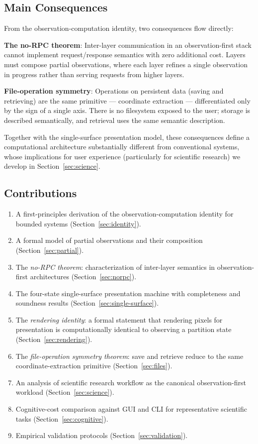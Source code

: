 \documentclass[11pt,twocolumn,a4paper]{article}
\theoremstyle{definition}
\theoremstyle{remark}
\begin{document}
\subsection{Main Consequences}

From the observation-computation identity, two consequences flow directly:

\textbf{The no-RPC theorem}: Inter-layer communication in an observation-first stack cannot implement request/response semantics with zero additional cost. Layers must compose partial observations, where each layer refines a single observation in progress rather than serving requests from higher layers.

\textbf{File-operation symmetry}: Operations on persistent data (saving and retrieving) are the same primitive --- coordinate extraction --- differentiated only by the sign of a single axis. There is no filesystem exposed to the user; storage is described semantically, and retrieval uses the same semantic description.

Together with the single-surface presentation model, these consequences define a computational architecture substantially different from conventional systems, whose implications for user experience (particularly for scientific research) we develop in Section~\ref{sec:science}.

\subsection{Contributions}

\begin{enumerate}
    \item A first-principles derivation of the observation-computation identity for bounded systems (Section~\ref{sec:identity}).
    \item A formal model of partial observations and their composition (Section~\ref{sec:partial}).
    \item The \emph{no-RPC theorem}: characterization of inter-layer semantics in observation-first architectures (Section~\ref{sec:norpc}).
    \item The four-state single-surface presentation machine with completeness and soundness results (Section~\ref{sec:single-surface}).
    \item The \emph{rendering identity}: a formal statement that rendering pixels for presentation is computationally identical to observing a partition state (Section~\ref{sec:rendering}).
    \item The \emph{file-operation symmetry theorem}: save and retrieve reduce to the same coordinate-extraction primitive (Section~\ref{sec:files}).
    \item An analysis of scientific research workflow as the canonical observation-first workload (Section~\ref{sec:science}).
    \item Cognitive-cost comparison against GUI and CLI for representative scientific tasks (Section~\ref{sec:cognitive}).
    \item Empirical validation protocols (Section~\ref{sec:validation}).
\end{enumerate}
\end{document}
